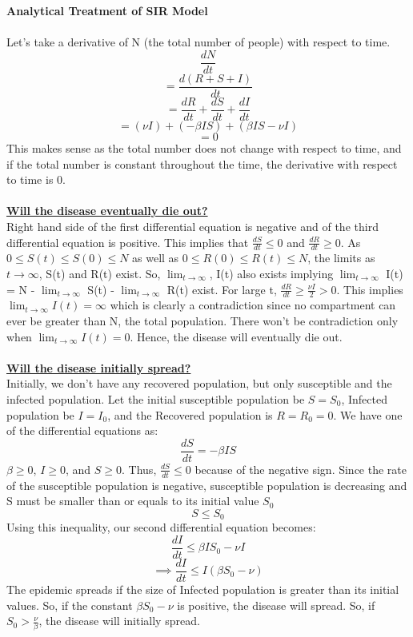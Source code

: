 \documentclass[11pt]{article}
\theoremstyle{definition}
\begin{document}
{\textbf{\large Analytical Treatment of SIR Model}}\\
\\
Let's take a derivative of N (the total number of people) with respect to time.
$$\frac{dN}{dt}$$
$$=\frac{d(R+S+I)}{dt}$$
$$=\frac{dR}{dt}+\frac{dS}{dt}+\frac{dI}{dt}$$
$$=(\nu I)+(-\beta IS)+(\beta I S -\nu I)$$
$$=0$$
This makes sense as the total number does not change with respect to time, and if the total number is constant throughout the time, the derivative with respect to time is 0.\\
\\
\textbf{\underline{Will the disease eventually die out?}}\\
Right hand side of the first differential equation is negative and of the third differential equation is positive. This implies that $\frac{dS}{dt}\leq 0$ and $\frac{dR}{dt}\geq 0$. As $0 \leq S(t) \leq S(0) \leq N$ as well as $0 \leq R(0) \leq R(t) \leq N$, the limits as $t\rightarrow \infty$, S(t) and R(t) exist. So, $\lim_{t\to\infty}$, I(t) also exists implying $\lim_{t\to\infty}$ I(t) = N - $\lim_{t\to\infty}$ S(t) - $\lim_{t\to\infty}$ R(t) exist. For large t, $\frac{dR}{dt}\geq \frac{\nu I}{2} > 0$. This implies $\lim_{t\to\infty} I(t) = \infty$ which is clearly a contradiction since no compartment can ever be greater than N, the total population. There won't be contradiction only when $\lim_{t\to\infty} I(t) = 0$. Hence, the disease will eventually die out.\\
\\
\textbf{\underline{Will the disease initially spread?}}\\
Initially, we don't have any recovered population, but only susceptible and the infected population. Let the initial susceptible population be $S = S_{0}$, Infected population be $I = I_{0}$, and the Recovered population is $R = R_{0} = 0$. We have one of the differential equations as:
$$\frac{dS}{dt}=-\beta IS$$
$\beta \geq  0$, $I \geq  0$, and $S \geq  0$. Thus, $\frac{dS}{dt} \leq 0$ because of the negative sign. Since the rate of the susceptible population is negative, susceptible population is decreasing and S must be smaller than or equals to its initial value $S_{0}$
$$S \leq S_{0}$$
Using this inequality, our second differential equation becomes:
$$\frac{dI}{dt} \leq \beta IS_{0} - \nu I$$
$$\implies \frac{dI}{dt} \leq I(\beta S_{0} - \nu )$$
The epidemic spreads if the size of Infected population is greater than its initial values. So, if the constant $\beta S_{0} - \nu $ is positive, the disease will spread. So, if $S_0 > \frac{\nu }{\beta}$, the disease will initially spread. \\
\end{document}
